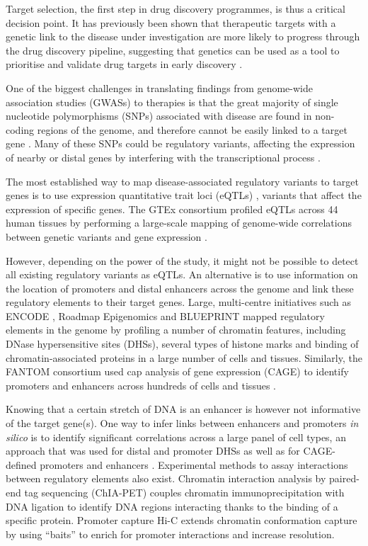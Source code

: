 \documentclass[9pt,a4paper,]{extarticle}
\theoremstyle{definition}
\theoremstyle{definition}
\theoremstyle{definition}
\theoremstyle{remark}
\begin{document}
Target selection, the first step in drug discovery programmes, is thus a critical decision point.
It has previously been shown that therapeutic targets with a genetic link to the disease under investigation are more likely to progress through the drug discovery pipeline, suggesting that genetics can be used as a tool to prioritise and validate drug targets in early discovery \citep{Plenge2013, Nelson2015}.

One of the biggest challenges in translating findings from genome-wide association studies (GWASs) to therapies is that the great majority of single nucleotide polymorphisms (SNPs) associated with disease are found in non-coding regions of the genome, and therefore cannot be easily linked to a target gene \citep{Maurano2012}.
Many of these SNPs could be regulatory variants, affecting the expression of nearby or distal genes by interfering with the transcriptional process \citep{Ward2012}.

The most established way to map disease-associated regulatory variants to target genes is to use expression quantitative trait loci (eQTLs) \citep{Albert2015}, variants that affect the expression of specific genes.
The GTEx consortium profiled eQTLs across 44 human tissues by performing a large-scale mapping of genome-wide correlations between genetic variants and gene expression \citep{GTEx2017}.

However, depending on the power of the study, it might not be possible to detect all existing regulatory variants as eQTLs.
An alternative is to use information on the location of promoters and distal enhancers across the genome and link these regulatory elements to their target genes.
Large, multi-centre initiatives such as ENCODE \citep{ENCODE2012}, Roadmap Epigenomics \citep{Roadmap2015} and BLUEPRINT \citep{Adams2012, Stunnenberg2016} mapped regulatory elements in the genome by profiling a number of chromatin features, including DNase hypersensitive sites (DHSs), several types of histone marks and binding of chromatin-associated proteins in a large number of cells and tissues.
Similarly, the FANTOM consortium used cap analysis of gene expression (CAGE) to identify promoters and enhancers across hundreds of cells and tissues \citep{Fantom2014}.

Knowing that a certain stretch of DNA is an enhancer is however not informative of the target gene(s).
One way to infer links between enhancers and promoters \emph{in silico} is to identify significant correlations across a large panel of cell types, an approach that was used for distal and promoter DHSs \citep{Thurman2012} as well as for CAGE-defined promoters and enhancers \citep{Andersson2014}.
Experimental methods to assay interactions between regulatory elements also exist.
Chromatin interaction analysis by paired-end tag sequencing (ChIA-PET) \citep{Fullwood2009, Zhang2013} couples chromatin immunoprecipitation with DNA ligation to identify DNA regions interacting thanks to the binding of a specific protein.
Promoter capture Hi-C \citep{Mifsud2015, Javierre2016} extends chromatin conformation capture by using ``baits'' to enrich for promoter interactions and increase resolution.
\end{document}
